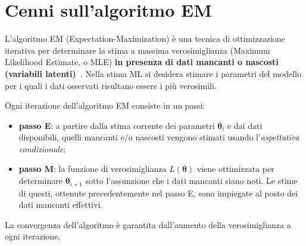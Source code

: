 \section[Cenni sull'algoritmo EM]{Cenni sull'algoritmo EM}
L'algoritmo EM (Expectation-Maximization) è una tecnica di ottimizzazione iterativa per determinare la stima a massima verosimiglianza (Maximum Likelihood Estimate, o MLE) \textbf{in presenza di dati mancanti o nascosti (variabili latenti)}~\cite{paper_EM}. Nella stima ML si desidera stimare i parametri del modello per i quali i dati osservati risultano essere i più verosimili. \par Ogni iterazione dell'algoritmo EM consiste in un passi:
\begin{itemize}
	\item \textbf{passo E}: a partire dalla stima corrente dei parametri $\boldsymbol{\theta}_i$ e dai dati disponibili, quelli mancanti e/o nascosti vengono stimati usando l'\textit{aspettativa condizionale};
	\item \textbf{passo M}: la funzione di verosimiglianza $L(\boldsymbol{\theta})$ viene ottimizzata per determinare $\boldsymbol{\theta}_{i+1}$ sotto l'assunzione che i dati mancanti siano noti. Le stime di questi, ottenute precedentemente nel passo E, sono impiegate al posto dei dati mancanti effettivi.
\end{itemize}
La convergenza dell'algoritmo è garantita dall'aumento della verosimiglianza a ogni iterazione.

